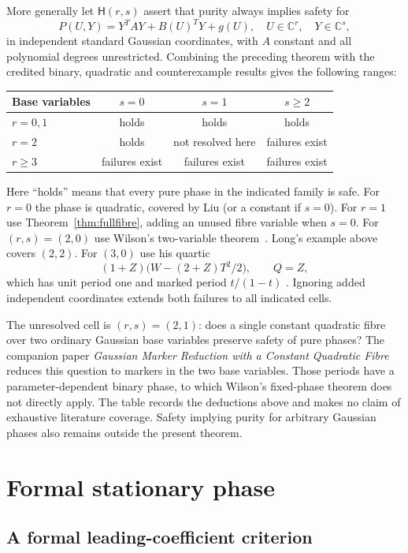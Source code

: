 \documentclass[11pt]{article}
\theoremstyle{definition}\newtheorem{definition}[theorem]{Definition}
\theoremstyle{remark}\newtheorem{remark}[theorem]{Remark}
\newcommand{\C}{\mathbb C}
\begin{document}
More generally let $\mathsf H(r,s)$ assert that purity always
implies safety for
\[
 P(U,Y)=Y^TAY+B(U)^TY+g(U),\quad
 U\in\C^r,\quad Y\in\C^s,
\]
in independent standard Gaussian coordinates, with $A$ constant
and all polynomial degrees unrestricted. Combining the preceding
theorem with the credited binary, quadratic and counterexample
results gives the following ranges:
\begin{center}
\begin{tabular}{@{}lccc@{}}
\toprule
Base variables & $s=0$ & $s=1$ & $s\ge2$\\\midrule
$r=0,1$ & holds & holds & holds\\
$r=2$ & holds & not resolved here & failures exist\\
$r\ge3$ & failures exist & failures exist & failures exist\\
\bottomrule
\end{tabular}
\end{center}
Here ``holds'' means that every pure phase in the indicated family is safe.
For $r=0$ the phase is quadratic, covered by Liu (or a constant
if $s=0$). For $r=1$ use Theorem~\ref{thm:fullfibre}, adding
an unused fibre variable when $s=0$. For $(r,s)=(2,0)$ use Wilson's
two-variable theorem~\cite[Theorem~1]{Wilson}. Long's example
above covers $(2,2)$. For $(3,0)$ use his quartic
\[
 (1+Z)\bigl(W-(2+Z)T^2/2\bigr),\qquad Q=Z,
\]
which has unit period one and marked period $t/(1-t)$
\cite[Theorem~5.1]{Long}. Ignoring added independent coordinates
extends both failures to all indicated cells.

The unresolved cell is $(r,s)=(2,1)$: does a single constant quadratic
fibre over two ordinary Gaussian base variables preserve safety of pure
phases? The companion paper \emph{Gaussian Marker Reduction with a Constant
Quadratic Fibre}~\cite{Marker} reduces this question to markers in the two base
variables. Those periods have a parameter-dependent binary phase, to
which Wilson's fixed-phase theorem does not directly apply. The table
records the deductions above and makes no claim of exhaustive literature
coverage. Safety implying purity for arbitrary Gaussian phases also
remains outside the present theorem.

\section{Formal stationary phase}
\subsection{A formal leading-coefficient criterion}\label{sec:stationaryballs}
\end{document}
